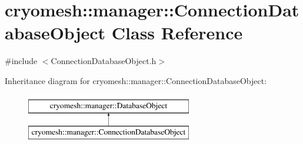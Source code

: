 \hypertarget{classcryomesh_1_1manager_1_1ConnectionDatabaseObject}{\section{cryomesh\-:\-:manager\-:\-:\-Connection\-Database\-Object \-Class \-Reference}
\label{classcryomesh_1_1manager_1_1ConnectionDatabaseObject}
}


{\ttfamily \#include $<$\-Connection\-Database\-Object.\-h$>$}

\-Inheritance diagram for cryomesh\-:\-:manager\-:\-:\-Connection\-Database\-Object\-:\begin{figure}[H]
\begin{center}
\leavevmode
\includegraphics[height=2.000000cm]{classcryomesh_1_1manager_1_1ConnectionDatabaseObject}
\end{center}
\end{figure}
